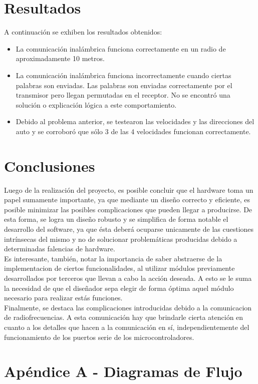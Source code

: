 \documentclass[a4paper,10pt]{article}
\begin{document}
	\section{Resultados}
		A continuación se exhiben los resultados obtenidos:
		\begin{itemize}
			\item La comunicación inalámbrica funciona correctamente en un radio de aproximadamente 10 metros.
			\item La comunicación inalámbrica funciona incorrectamente cuando ciertas palabras son enviadas. Las palabras son enviadas correctamente por el 
			transmisor pero llegan permutadas en el receptor. No se encontró una solución o explicación lógica a este comportamiento.
			\item Debido al problema anterior, se testearon las velocidades y las direcciones del auto y se corroboró que sólo 3 de las 4 velocidades funcionan
			correctamente.
		\end{itemize}
   
	\section{Conclusiones}
		Luego de la realización del proyecto, es posible concluir que el hardware toma un papel sumamente importante, ya que mediante un diseño correcto y eficiente, es posible minimizar las posibles complicaciones que pueden llegar a producirse. De esta forma, se logra un diseño robusto y se simplifica de forma notable el desarrollo del software, ya que ésta deberá ocuparse unicamente de las cuestiones intrínsecas del mismo y no de solucionar problemáticas producidas debido a determinadas falencias de hardware.\\
		\indent Es interesante, también, notar la importancia de saber abstraerse de la implementacion de ciertos funcionalidades, al utilizar módulos previamente desarrollados por terceros que llevan a cabo la acción deseada. A esto se le suma la necesidad de que el diseñador sepa elegir de forma óptima aquel módulo necesario para realizar estás funciones.\\
		\indent Finalmente, se destaca las complicaciones introducidas debido a la comunicacion de radiofrecuencias. A esta comunicación hay que brindarle cierta atención en cuanto a los detalles que hacen a la comunicación en sí, independientemente  del funcionamiento de los puertos serie de los microcontroladores.
			
\newpage

		\section{Apéndice A - Diagramas de Flujo}
\end{document}
